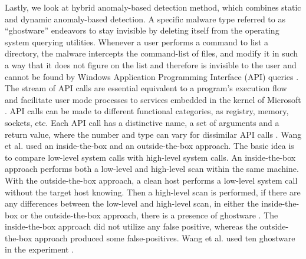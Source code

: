 \documentclass[12pt]{article} %
\begin{document}
Lastly, we look at hybrid anomaly-based detection method, which combines static and dynamic anomaly-based detection. A specific malware type referred to as “ghostware” endeavors to stay invisible by deleting itself from the operating system querying utilities. Whenever a user performs a command to list a directory, the malware intercepts the command-list of files, and modify it in such a way that it does not figure on the list and therefore is invisible to the user and cannot be found by Windows Application Programming Interface  (API) queries \cite{idika2007survey}. The stream of API calls are essential equivalent to a program’s execution flow and facilitate user mode processes to services embedded in the kernel of Microsoft \cite{ahmed2009using}. API calls can be made to different functional categories, as registry, memory, sockets, etc. Each API call has a distinctive name, a set of arguments and a return value, where the number and type can vary for dissimilar API calls \cite{ahmed2009using}. Wang et al. \cite{idika2007survey} used an inside-the-box and  an outside-the-box approach. The basic idea is to compare low-level system calls with high-level system calls. An inside-the-box approach performs both a low-level and high-level scan within the same machine. With the outside-the-box approach, a clean host performs a low-level system call without the target host knowing. Then a high-level scan is performed, if there are any differences between the low-level and high-level scan, in either the inside-the-box or the outside-the-box approach, there is a presence of ghostware \cite{idika2007survey}. The inside-the-box approach did not utilize any false positive, whereas the outside-the-box approach produced some false-positives. Wang et al. \cite{idika2007survey} used ten ghostware in the experiment \cite{idika2007survey}.
\\
\end{document}
